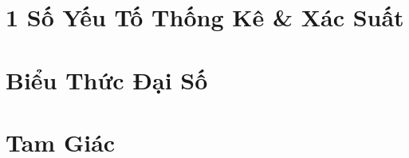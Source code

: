 \documentclass{article}
\numberwithin{equation}{section}
\begin{document}

\section{1 Số Yếu Tố Thống Kê \& Xác Suất}


\section{Biểu Thức Đại Số}


\section{Tam Giác}


\printbibliography[heading=bibintoc]
	
\end{document}
